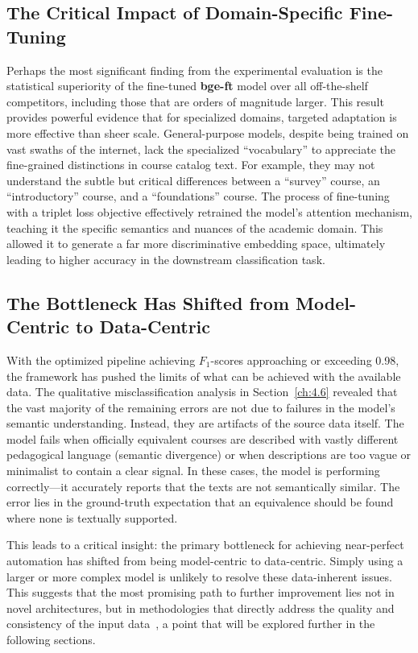 \subsection{The Critical Impact of Domain-Specific Fine-Tuning}\label{ch:5.1.2}
Perhaps the most significant finding from the experimental evaluation is the statistical superiority of the fine-tuned \textbf{bge-ft} model over all off-the-shelf competitors, including those that are orders of magnitude larger. This result provides powerful evidence that for specialized domains, targeted adaptation is more effective than sheer scale. General-purpose models, despite being trained on vast swaths of the internet, lack the specialized ``vocabulary'' to appreciate the fine-grained distinctions in course catalog text. For example, they may not understand the subtle but critical differences between a ``survey'' course, an ``introductory'' course, and a ``foundations'' course. The process of fine-tuning with a triplet loss objective effectively retrained the model's attention mechanism, teaching it the specific semantics and nuances of the academic domain. This allowed it to generate a far more discriminative embedding space, ultimately leading to higher accuracy in the downstream classification task.

\subsection{The Bottleneck Has Shifted from Model-Centric to Data-Centric}\label{ch:5.1.3}
With the optimized pipeline achieving \(F_1\)-scores approaching or exceeding 0.98, the framework has pushed the limits of what can be achieved with the available data. The qualitative misclassification analysis in Section~\ref{ch:4.6} revealed that the vast majority of the remaining errors are not due to failures in the model's semantic understanding. Instead, they are artifacts of the source data itself. The model fails when officially equivalent courses are described with vastly different pedagogical language (semantic divergence) or when descriptions are too vague or minimalist to contain a clear signal. In these cases, the model is performing correctly—it accurately reports that the texts are not semantically similar. The error lies in the ground-truth expectation that an equivalence should be found where none is textually supported.

This leads to a critical insight: the primary bottleneck for achieving near-perfect automation has shifted from being model-centric to data-centric. Simply using a larger or more complex model is unlikely to resolve these data-inherent issues. This suggests that the most promising path to further improvement lies not in novel architectures, but in methodologies that directly address the quality and consistency of the input data~\cite{gauthier2022}, a point that will be explored further in the following sections.

